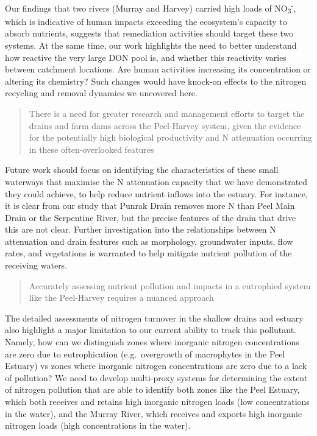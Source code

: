\documentclass[
]{book}
\begin{document}
Our findings that two rivers (Murray and Harvey) carried high loads of NO\textsubscript{3}\textsuperscript{-}, which is indicative of human impacts exceeding the ecosystem's capacity to absorb nutrients, suggests that remediation activities should target these two systems. At the same time, our work highlights the need to better understand how reactive the very large DON pool is, and whether this reactivity varies between catchment locations. Are human activities increasing its concentration or altering its chemistry? Such changes would have knock-on effects to the nitrogen recycling and removal dynamics we uncovered here.

\begin{quote}
There is a need for greater research and management efforts to target the drains and farm dams across the Peel-Harvey system, given the evidence for the potentially high biological productivity and N attenuation occurring in these often-overlooked features
\end{quote}

Future work should focus on identifying the characteristics of these small waterways that maximise the N attenuation capacity that we have demonstrated they could achieve, to help reduce nutrient inflows into the estuary. For instance, it is clear from our study that Punrak Drain removes more N than Peel Main Drain or the Serpentine River, but the precise features of the drain that drive this are not clear. Further investigation into the relationships between N attenuation and drain features such as morphology, groundwater inputs, flow rates, and vegetations is warranted to help mitigate nutrient pollution of the receiving waters.~

\begin{quote}
Accurately assessing nutrient pollution and impacts in a eutrophied system like the Peel-Harvey requires a nuanced approach
\end{quote}

The detailed assessments of nitrogen turnover in the shallow drains and estuary also highlight a major limitation to our current ability to track this pollutant. Namely, how can we distinguish zones where inorganic nitrogen concentrations are zero due to eutrophication (e.g.~overgrowth of macrophytes in the Peel Estuary) vs zones where inorganic nitrogen concentrations are zero due to a lack of pollution? We need to develop multi-proxy systems for determining the extent of nitrogen pollution that are able to identify both zones like the Peel Estuary, which both receives and retains high inorganic nitrogen loads (low concentrations in the water), and the Murray River, which receives and exports high inorganic nitrogen loads (high concentrations in the water).~
\end{document}
